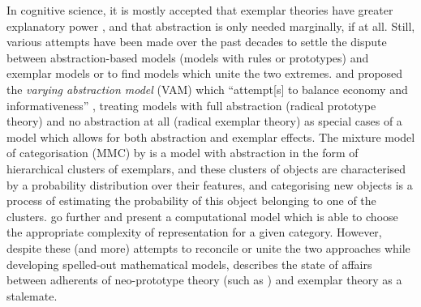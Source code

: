 In cognitive science, it is mostly accepted that exemplar theories have greater explanatory power \citep[184]{Vanpaemel2016}, and that abstraction is only needed marginally, if at all.
Still, various attempts have been made over the past decades to settle the dispute between abstraction-based models (models with rules or prototypes) and exemplar models or to find models which unite the two extremes.
\cite{VanpaemelStorms2008} and \citet{LeeVanpaemel2008} proposed the \textit{varying abstraction model} (VAM) which ``attempt[s] to balance economy and informativeness'' \citep[745]{LeeVanpaemel2008}, treating models with full abstraction (radical prototype theory) and no abstraction at all (radical exemplar theory) as special cases of a model which allows for both abstraction and exemplar effects.
The mixture model of categorisation (MMC) by \cite{Rosseel2002} is a model with abstraction in the form of hierarchical clusters of exemplars, and these clusters of objects are characterised by a probability distribution over their features, and categorising new objects is a process of estimating the probability of this object belonging to one of the clusters.
\cite{GriffithsEa2009} go further and present a computational model which is able to choose the appropriate complexity of representation for a given category.
However, despite these (and more) attempts to reconcile or unite the two approaches while developing spelled-out mathematical models, \cite[183--184]{Vanpaemel2016} describes the state of affairs between adherents of neo-prototype theory (such as \citealp{MindaSmith2001,MindaSmith2002}) and exemplar theory as a stalemate.

